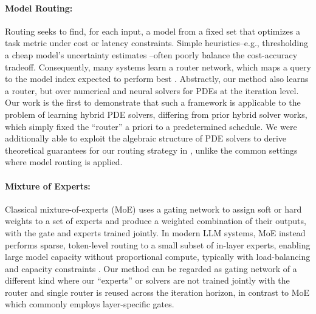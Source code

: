 \documentclass{article} %
\begin{document}
\paragraph{Model Routing:} Routing \citep{shnitzer2023large,hu2024routerbench,ding2024hybrid,huang2025routereval} seeks to find, for each input, a model from a fixed set that optimizes a task metric under cost or latency constraints. Simple heuristics--e.g., thresholding a cheap model's uncertainty estimates \citep{chuang2024learning,chuang2025confident}--often poorly balance the cost-accuracy tradeoff. Consequently, many systems learn a router network, which maps a query to the model index expected to perform best \citep{hari2023tryage,mohammadshahi2024routoo,vsakota2024fly}. Abstractly, our method also learns a router, but over numerical and neural solvers for PDEs at the iteration level. Our work is the first to demonstrate that such a framework is applicable to the problem of learning hybrid PDE solvers, differing from prior hybrid solver works, which simply fixed the ``router'' a priori to a predetermined schedule. We were additionally able to exploit the algebraic structure of PDE solvers to derive theoretical guarantees for our routing strategy in , unlike the common settings where model routing is applied.

\paragraph{Mixture of Experts:} Classical mixture-of-experts (MoE) \citep{jacobs1991adaptive,jordan1994hierarchical} uses a gating network to assign soft or hard weights to a set of experts and produce a weighted combination of their outputs, with the gate and experts trained jointly. In modern LLM systems, MoE instead performs sparse, token-level routing to a small subset of in-layer experts, enabling large model capacity without proportional compute, typically with load-balancing and capacity constraints \citep{shazeer2017outrageously,lepikhin2020gshard,fedus2022switch,jiang2024mixtral}. 
Our method can be regarded as gating network of a different kind where our ``experts'' or solvers are not trained jointly with the router and single router is reused across the iteration horizon, in contrast to MoE which commonly employs layer-specific gates.



\end{document}
